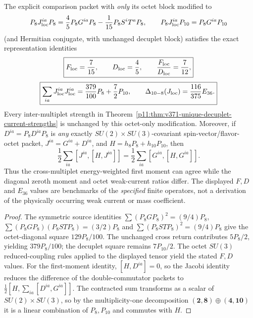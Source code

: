 \documentclass[12pt,a4paper]{article}
\begin{document}
\begin{corollary}
\label{p11:cor:v372-octet-dressing-moment-firewall}
The explicit comparison packet with \emph{only} its octet block
modified to
\[
 P_8J_{\rm loc}^{ia}P_8
 =\frac45P_8G^{ia}P_8-\frac1{15}P_8S^iT^aP_8,
 \qquad P_8J_{\rm loc}^{ia}P_{10}=P_8G^{ia}P_{10}
\]
(and Hermitian conjugate, with unchanged decuplet block)
satisfies the exact representation identities
\[
 \boxed{F_{\rm loc}=\frac7{15},\qquad D_{\rm loc}=\frac45,
 \qquad \frac{F_{\rm loc}}{D_{\rm loc}}=\frac7{12},}
\]
\[
 \boxed{\sum_{ia}J_{\rm loc}^{ia}J_{\rm loc}^{ia}
 =\frac{379}{100}P_8+\frac72P_{10},\qquad
 \Delta_{10-8}(J_{\rm loc})=\frac{116}{375}E_{36}.}
\]
Every inter-multiplet strength in
Theorem~\ref{p11:thm:v371-unique-decuplet-current-strengths}
is unchanged by this octet-only modification. Moreover, if
$D^{ia}=P_8D^{ia}P_8$ is \emph{any} exactly
$SU(2)\times SU(3)$-covariant spin-vector/flavor-octet packet,
$J^{ia}=G^{ia}+D^{ia}$, and $H=h_8P_8+h_{10}P_{10}$, then
\[
 \boxed{\frac12\sum_{ia}[J^{ia},[H,J^{ia}]]
 =\frac12\sum_{ia}[G^{ia},[H,G^{ia}]].}
\]
Thus the cross-multiplet energy-weighted first moment can agree
while the diagonal zeroth moment and octet weak-current ratios differ.
The displayed $F,D$ and $E_{36}$ values are benchmarks of the
\emph{specified} finite operators, not a derivation of the
physically occurring weak current or mass coefficient.
\end{corollary}
\begin{proof}
The symmetric source identities
$\sum(P_8GP_8)^2=(9/4)P_8$,
$\sum(P_8GP_8)(P_8STP_8)=(3/2)P_8$ and
$\sum(P_8STP_8)^2=(9/4)P_8$ give the octet-diagonal
square $129P_8/100$. The unchanged cross return contributes
$5P_8/2$, yielding $379P_8/100$; the decuplet square remains
$7P_{10}/2$. The octet $SU(3)$ reduced-coupling rules applied
to the displayed tensor yield the stated $F,D$ values.
For the first-moment identity, $[H,D^{ia}]=0$, so the
Jacobi identity reduces the difference of the double-commutator
packets to $\tfrac12[H,\sum_{ia}[D^{ia},G^{ia}]]$.
The contracted sum transforms as a scalar of $SU(2)\times SU(3)$,
so by the multiplicity-one decomposition
$(\mathbf2,\mathbf8)\oplus(\mathbf4,\mathbf{10})$ it is a
linear combination of $P_8,P_{10}$ and commutes with $H$.
\end{proof}
\end{document}
